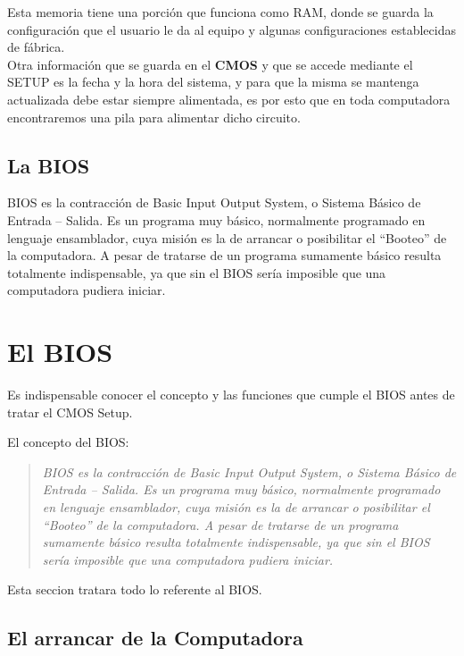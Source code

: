 \documentclass[12pt,oneside,a4paper]{article}
\begin{document}
		Esta memoria tiene una porción que funciona como RAM, donde se guarda la
		configuración que el usuario le da al equipo y algunas configuraciones
		establecidas de fábrica. \\ 
		Otra información que se guarda en el {\bf CMOS} y que se accede mediante el
		SETUP es la fecha y la hora del sistema, y para que la misma se mantenga
		actualizada debe estar siempre alimentada, es por esto que en toda
		computadora encontraremos una pila para alimentar dicho circuito.

		\subsection{La BIOS}{\label{sec:conceptos/BIOS}}

		BIOS es la contracción de Basic Input Output System, o Sistema Básico de
		Entrada – Salida. 
		Es un programa muy básico, normalmente programado en lenguaje ensamblador,
		cuya misión es la de arrancar o posibilitar el “Booteo” de la computadora.
		A pesar de tratarse de un programa sumamente básico resulta totalmente
		indispensable, ya que sin el BIOS sería imposible que una computadora pudiera
		iniciar.

	\newpage

\section{El BIOS}{\label{sec:bios}}

Es indispensable conocer el concepto y las funciones que cumple el BIOS antes de tratar el CMOS Setup.

El concepto del BIOS:
\begin{quotation}

	{\em BIOS es la contracción de Basic Input Output System, o Sistema Básico de
	Entrada – Salida. 
	Es un programa muy básico, normalmente programado en lenguaje ensamblador,
	cuya misión es la de arrancar o posibilitar el “Booteo” de la computadora.
	A pesar de tratarse de un programa sumamente básico resulta totalmente
	indispensable, ya que sin el BIOS sería imposible que una computadora pudiera
	iniciar.}

\end{quotation}

Esta seccion tratara todo lo referente al BIOS.

	\subsection{El arrancar de la Computadora}{\label{sec:bios/arranque}}
\end{document}
